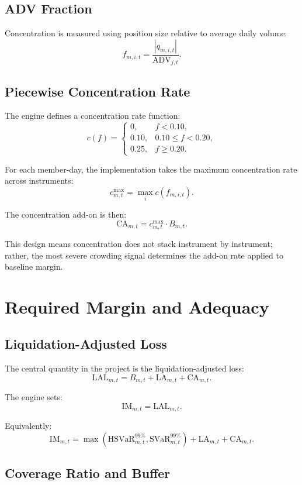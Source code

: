 \documentclass[11pt]{article}
\begin{document}
\subsection{ADV Fraction}

Concentration is measured using position size relative to average daily volume:
\[
f_{m,i,t} = \frac{|q_{m,i,t}|}{\text{ADV}_{j,t}}.
\]

\subsection{Piecewise Concentration Rate}

The engine defines a concentration rate function:
\[
c(f) =
\begin{cases}
0, & f < 0.10,\\
0.10, & 0.10 \le f < 0.20,\\
0.25, & f \ge 0.20.
\end{cases}
\]

For each member-day, the implementation takes the maximum concentration rate across instruments:
\[
c_{m,t}^{\max} = \max_i c(f_{m,i,t}).
\]

The concentration add-on is then:
\[
\text{CA}_{m,t} = c_{m,t}^{\max} \cdot B_{m,t}.
\]

This design means concentration does not stack instrument by instrument; rather, the most severe crowding signal determines the add-on rate applied to baseline margin.

\section{Required Margin and Adequacy}

\subsection{Liquidation-Adjusted Loss}

The central quantity in the project is the liquidation-adjusted loss:
\[
\text{LAL}_{m,t}
=
B_{m,t} + \text{LA}_{m,t} + \text{CA}_{m,t}.
\]

The engine sets:
\[
\text{IM}_{m,t} = \text{LAL}_{m,t}.
\]

Equivalently:
\[
\text{IM}_{m,t}
=
\max\left(\text{HSVaR}_{m,t}^{99\%}, \text{SVaR}_{m,t}^{99\%}\right)
 + \text{LA}_{m,t}
 + \text{CA}_{m,t}.
\]

\subsection{Coverage Ratio and Buffer}
\end{document}
